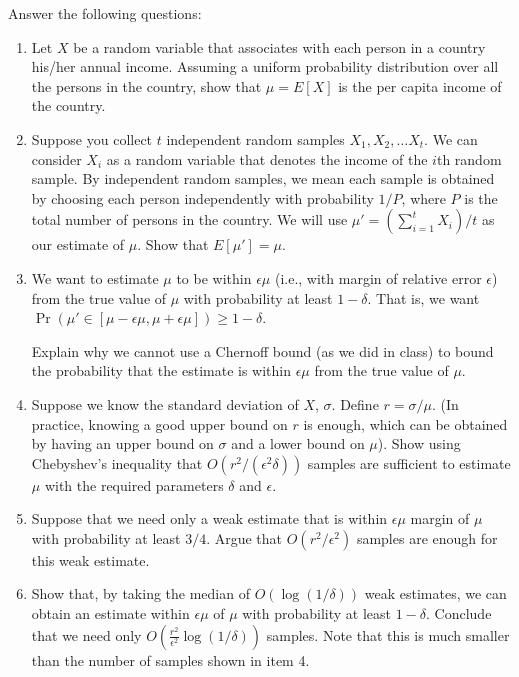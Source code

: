 \documentclass[11pt]{article}
\begin{document}
Answer the following questions:
\begin{enumerate}
    
\item Let $X$ be a random variable that associates with each person in a country his/her annual income. Assuming a uniform probability distribution over all the persons in the country,
show that   $\mu = E[X]$ is the per capita income of the country.


\item Suppose you collect $t$ independent random samples $X_1,X_2, \dots X_t$.  We can consider $X_i$ as a random variable that denotes the income of the $i$th random sample. By independent random samples, we mean each sample is obtained by choosing each person independently with probability $1/P$, where
$P$ is the total number of persons in the country. 
We will use $\mu' =  (\sum_{i =1}^t X_i)/t$
as our estimate of $\mu$.
Show that $E[\mu'] = \mu$.


\item  We want to estimate $\mu$ to be within $\epsilon\mu$ (i.e., with margin of relative error $\epsilon$) from the true value of
$\mu$ with probability at least $1-\delta$.  That is, we
want $\Pr(\mu' \in [\mu - \epsilon\mu, \mu + \epsilon\mu]) \geq 1-\delta$.

 Explain why we cannot use a Chernoff bound (as we did in class) to bound the probability that the estimate is within  $\epsilon \mu$ from the true value of $\mu$.
 
\item Suppose we know the standard deviation of $X$, $\sigma$. 
Define $ r = \sigma/\mu$. (In practice, knowing a good upper bound on $r$ is enough, which can be obtained by having
an upper bound on $\sigma$ and a lower bound on $\mu$). Show using Chebyshev's inequality that $O(r^2/(\epsilon^2\delta))$ samples are sufficient to estimate $\mu$ with the required parameters $\delta$ and $\epsilon$.

\item  Suppose that we need only a weak estimate that is within $\epsilon \mu$ margin  of $\mu$ with probability at least
$3/4$. Argue that $O(r^2/\epsilon^2)$ samples are enough for this weak estimate.

\item Show that, by taking the median of $O(\log(1/\delta))$ weak estimates, we can obtain an estimate within
$\epsilon \mu$ of $\mu$ with probability at least $1 - \delta$. Conclude that we need only
$O(\frac{r^2}{\epsilon^2} \log (1/\delta))$ samples. Note that this is much smaller than the number of samples shown in item 4.

\end{enumerate}
\end{document}

